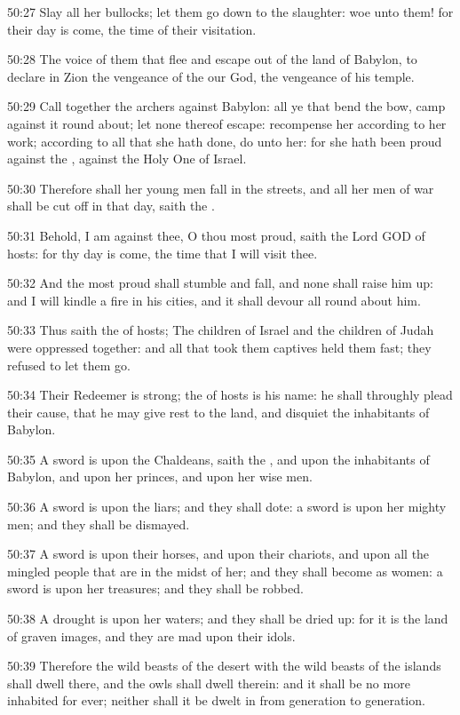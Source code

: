 50:27 Slay all her bullocks; let them go down to the slaughter: woe
unto them! for their day is come, the time of their visitation.

50:28 The voice of them that flee and escape out of the land of
Babylon, to declare in Zion the vengeance of the \LORD our God, the
vengeance of his temple.

50:29 Call together the archers against Babylon: all ye that bend the
bow, camp against it round about; let none thereof escape: recompense
her according to her work; according to all that she hath done, do
unto her: for she hath been proud against the \LORD, against the Holy
One of Israel.

50:30 Therefore shall her young men fall in the streets, and all her
men of war shall be cut off in that day, saith the \LORD.

50:31 Behold, I am against thee, O thou most proud, saith the Lord GOD
of hosts: for thy day is come, the time that I will visit thee.

50:32 And the most proud shall stumble and fall, and none shall raise
him up: and I will kindle a fire in his cities, and it shall devour
all round about him.

50:33 Thus saith the \LORD of hosts; The children of Israel and the
children of Judah were oppressed together: and all that took them
captives held them fast; they refused to let them go.

50:34 Their Redeemer is strong; the \LORD of hosts is his name: he
shall throughly plead their cause, that he may give rest to the land,
and disquiet the inhabitants of Babylon.

50:35 A sword is upon the Chaldeans, saith the \LORD, and upon the
inhabitants of Babylon, and upon her princes, and upon her wise men.

50:36 A sword is upon the liars; and they shall dote: a sword is upon
her mighty men; and they shall be dismayed.

50:37 A sword is upon their horses, and upon their chariots, and upon
all the mingled people that are in the midst of her; and they shall
become as women: a sword is upon her treasures; and they shall be
robbed.

50:38 A drought is upon her waters; and they shall be dried up: for it
is the land of graven images, and they are mad upon their idols.

50:39 Therefore the wild beasts of the desert with the wild beasts of
the islands shall dwell there, and the owls shall dwell therein: and
it shall be no more inhabited for ever; neither shall it be dwelt in
from generation to generation.

